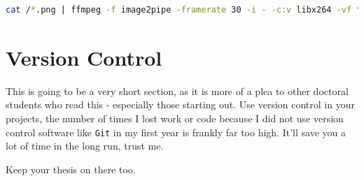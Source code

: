 \begin{lstlisting}[language=bash]
cat /*.png | ffmpeg -f image2pipe -framerate 30 -i - -c:v libx264 -vf format=yuv420p output.mp4
\end{lstlisting}

\section{Version Control}

This is going to be a very short section, as it is more of a plea to other doctoral students who read this - especially those starting out.
Use version control in your projects, the number of times I lost work or code because I did not use version control software like \texttt{Git} in my first year is frankly far too high.
It'll save you a lot of time in the long run, trust me.

\noindent
Keep your thesis on there too.